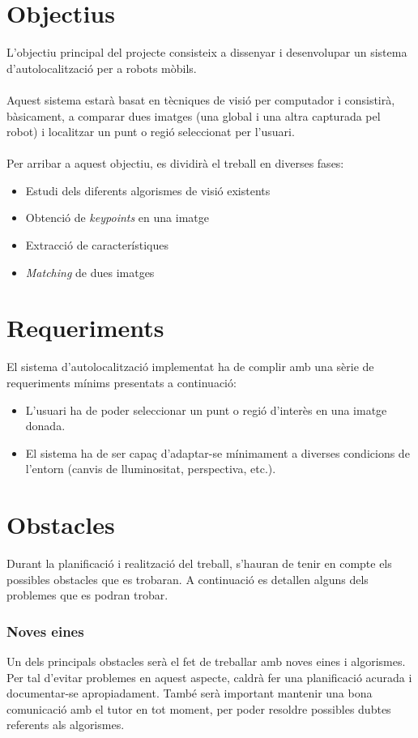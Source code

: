 \section{Objectius}
	L'objectiu principal del projecte consisteix a dissenyar i desenvolupar un sistema d'autolocalització per a robots mòbils.\\\\
	Aquest sistema estarà basat en tècniques de visió per computador i consistirà, bàsicament, a comparar dues imatges (una global i una altra capturada pel robot)
	i localitzar un punt o regió seleccionat per l'usuari.\\\\	
	Per arribar a aquest objectiu, es dividirà el treball en diverses fases:\\
	\begin{itemize}
		\item Estudi dels diferents algorismes de visió existents
		\item Obtenció de \textit{keypoints} en una imatge
		\item Extracció de característiques
		\item \textit{Matching} de dues imatges
	\end{itemize}
\section{Requeriments}
	El sistema d'autolocalització implementat ha de complir amb una sèrie de requeriments mínims presentats a continuació:\\
	\begin{itemize}
		\item L'usuari ha de poder seleccionar un punt o regió d'interès en una imatge donada.
		\item El sistema ha de ser capaç d'adaptar-se mínimament a diverses condicions de l'entorn (canvis de lluminositat, perspectiva, etc.).
	\end{itemize}
\newpage
\section{Obstacles}
	Durant la planificació i realització del treball, s'hauran de tenir en compte els possibles obstacles que es trobaran. A continuació es detallen alguns dels problemes que es podran trobar.
	\subsubsection{Noves eines}
		Un dels principals obstacles serà el fet de treballar amb noves eines i algorismes. Per tal d'evitar problemes en aquest aspecte, caldrà fer una planificació acurada i documentar-se apropiadament.
		També serà important mantenir una bona comunicació amb el tutor en tot moment, per poder resoldre possibles dubtes referents als algorismes.
